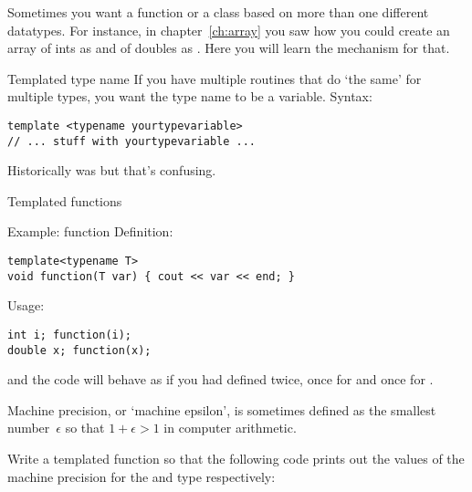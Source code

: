 
Sometimes you want a function or a class based on more than one
different datatypes. For instance, in chapter~\ref{ch:array} you saw
how you could create an array of ints as  and
of doubles as . Here you will learn the mechanism
for that.

\begin{block}{Templated type name}
  \label{sl:template-gen}
  If you have multiple routines that do `the same' for multiple types,
  you want the type name to be a variable. Syntax:
\begin{lstlisting}
template <typename yourtypevariable>
// ... stuff with yourtypevariable ...
\end{lstlisting}
\end{block}

Historically  was  but that's confusing.

 {Templated functions}

\begin{block}{Example: function}
  \label{sl:template-fun}
  Definition:
\begin{lstlisting}
template<typename T>
void function(T var) { cout << var << end; }
\end{lstlisting}
Usage:
\begin{lstlisting}
int i; function(i);
double x; function(x);
\end{lstlisting}
and the code will behave as if you had defined  twice,
once for  and once for .
\end{block}

\begin{exercise}
  \label{ex:eps-template}
  Machine precision, or `machine epsilon', is sometimes defined as the
  smallest number~$\epsilon$ so that $1+\epsilon>1$ in computer
  arithmetic.

  Write a templated function  so that the following code
  prints out the values of the machine precision for the  and
   type respectively:
\end{exercise}

